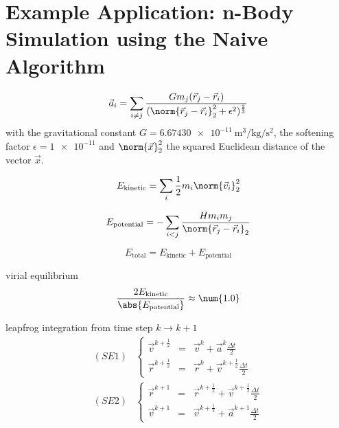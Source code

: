 \section{Example Application: n-Body Simulation using the Naive Algorithm}

\cite{own_nbody}
\cite{own_nbody_edu}

\begin{equation}\label{eq:acceleration}
    \Vec{a}_i = \sum\limits_{i \neq j} \frac{G m_j (\Vec{r}_j - \Vec{r}_i)}{(\norm{\Vec{r}_j - \Vec{r}_i}^2_2 + \epsilon^2)^\frac{2}{3}}
\end{equation}
with the gravitational constant $G = \SI{6.67430e-11}{\meter\cubed\per\kilo\gram\per\second\squared}$, the softening factor $\epsilon = \num{1e-11}$ and $\norm{\Vec{x}}^2_2$ the squared Euclidean distance of the vector $\Vec{x}$.

\begin{equation}\label{eq:kinetic_energy}
    E_{\text{kinetic}} = \sum\limits_i \frac{1}{2} m_i \norm{\Vec{v}_i}^2_2
\end{equation}

\begin{equation}\label{eq:potential_energy}
    E_{\text{potential}} = -\sum\limits_{i < j} \frac{H m_i m_j}{\norm{\Vec{r}_j - \Vec{r}_i}_2}
\end{equation}

\begin{equation}\label{eq:total_energy}
    E_{\text{total}} = E_{\text{kinetic}} + E_{\text{potential}}
\end{equation}

virial equilibrium
\begin{equation}\label{eq:virial_equilibrium}
    \frac{2E_{\text{kinetic}}}{\abs{E_{\text{potential}}}} \approx \num{1.0}
\end{equation}

leapfrog integration from time step $k \rightarrow k + 1$
\begin{equation}\label{eq:leapfrog}
    \begin{split}
      (SE1) &\left\lbrace
      \begin{array}{rcl}
        \vec{v}^{k+\frac{1}{2}} & = & \vec{v}^k + \vec{a}^k \frac{\Delta t}{2}               \\
        \vec{r}^{k+\frac{1}{2}} & = & \vec{r}^k + \vec{v}^{k + \frac{1}{2}} \frac{\Delta t}{2}
      \end{array}\right.\\[.5em]
      (SE2) &\left\lbrace
      \begin{array}{rcl}
        \vec{r}^{k+1} & = & \vec{r}^{k + \frac{1}{2}} + \vec{v}^{k + \frac{1}{2}} \frac{\Delta t}{2} \\
        \vec{v}^{k+1} & = & \vec{v}^{k + \frac{1}{2}} + \vec{a}^{k+1} \frac{\Delta t}{2}
      \end{array}\right.\\
    \end{split}
\end{equation}


